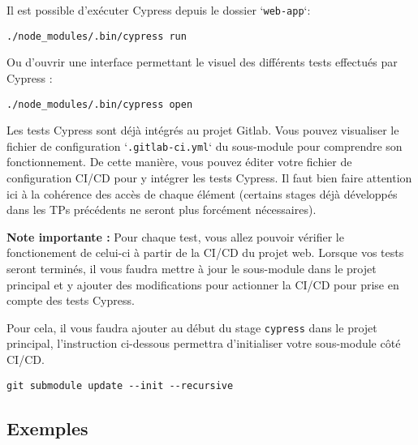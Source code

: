 \documentclass[11pt,a4paper,oneside]{article}
\begin{document}
\vspace{5mm}

Il est possible d'exécuter Cypress depuis le dossier `\texttt{web-app}`:
\begin{lstlisting}[style=custombash]
./node_modules/.bin/cypress run
\end{lstlisting}

\vspace{2mm}

Ou d'ouvrir une interface permettant le visuel des différents tests effectués par Cypress :
\begin{lstlisting}[style=custombash]
./node_modules/.bin/cypress open
\end{lstlisting}

\vspace{5mm}

Les tests Cypress sont déjà intégrés au projet Gitlab. Vous pouvez visualiser le fichier de configuration `\texttt{.gitlab-ci.yml}` du sous-module pour comprendre son fonctionnement. De cette manière, vous pouvez éditer votre fichier de configuration CI/CD pour y intégrer les tests Cypress. Il faut bien faire attention ici à la cohérence des accès de chaque élément (certains stages déjà développés dans les TPs précédents ne seront plus forcément nécessaires). 

\vspace{2mm}
\textbf{Note importante :} Pour chaque test, vous allez pouvoir vérifier le fonctionement de celui-ci à partir de la CI/CD du projet web. Lorsque vos tests seront terminés, il vous faudra mettre à jour le sous-module dans le projet principal et y ajouter des modifications pour actionner la CI/CD pour prise en compte des tests Cypress.

\vspace{2mm}
Pour cela, il vous faudra ajouter au début du stage \texttt{cypress} dans le projet principal, l'instruction ci-dessous permettra d'initialiser votre sous-module côté CI/CD.
\begin{lstlisting}[style=custombash]
 git submodule update --init --recursive
\end{lstlisting}

\subsection{Exemples}
\end{document}
